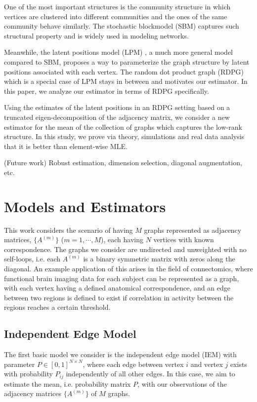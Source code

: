 \documentclass[a4paper]{article}
\begin{document}
One of the most important structures is the community structure in which vertices are clustered into different communities and the ones of the same community behave similarly. The stochastic blockmodel (SBM) \cite{holland1983stochastic} captures such structural property and is widely used in modeling networks.

Meanwhile, the latent positions model (LPM) \cite{hoff2002latent}, a much more general model compared to SBM, proposes a way to parameterize the graph structure by latent positions associated with each vertex. The random dot product graph (RDPG) \cite{young2007random, nickel2007random} which is a special case of LPM stays in between and motivates our estimator. In this paper, we analyze our estimator in terms of RDPG specifically.

Using the estimates of the latent positions in an RDPG setting based on a truncated eigen-decomposition of the adjacency matrix, we consider a new estimator for the mean of the collection of graphs which captures the low-rank structure. In this study, we prove via theory, simulations and real data analysis that it is better than element-wise MLE.

(Future work) Robust estimation, dimension selection, diagonal augmentation, etc.



\section{Models and Estimators}
\label{section:model_estimator}
This work considers the scenario of having $M$ graphs represented as adjacency matrices, $\{A^{(m)}\}$ ($m = 1, \cdots, M$), each having $N$ vertices with known correspondence. The graphs we consider are undirected and unweighted with no self-loops, i.e. each $A^{(m)}$ is a binary symmetric matrix with zeros along the diagonal. An example application of this arises in the field of connectomics, where functional brain imaging data for each subject can be represented as a graph, with each vertex having a defined anatomical correspondence, and an edge between two regions is defined to exist if correlation in activity between the regions reaches a certain threshold.



\subsection{Independent Edge Model}
The first basic model we consider is the independent edge model (IEM) with parameter $P \in [0,1]^{N\times N}$\cite{bollobas2007phase}, where each edge between vertex $i$ and vertex $j$ exists with probability $P_{ij}$ independently of all other edges. In this case, we aim to estimate the mean, i.e. probability matrix $P$, with our observations of the adjacency matrices $\{A^{(m)}\}$ of $M$ graphs.
\end{document}
